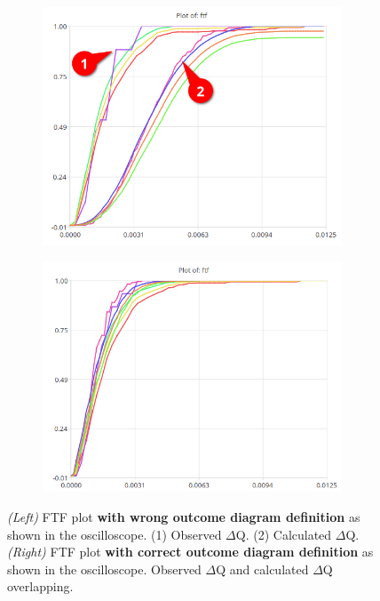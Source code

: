         \begin{figure}[H]
            \centering
            \begin{subfigure}{.5\textwidth}
                \centering
                \includegraphics[width =0.98\textwidth]{img/bad1.png}
                \label{fig:bad}
            \end{subfigure}%
            \begin{subfigure}{.5\textwidth}%
                \centering%
                \includegraphics[width =0.98\textwidth]{img/good.png}%
                \label{fig:good}%
            \end{subfigure}%
            \caption{\textit{(Left)} FTF plot \textbf{with wrong outcome diagram definition} as shown in the oscilloscope. (1) Observed $\Delta$Q. (2) Calculated $\Delta$Q. \\
            \textit{(Right)} FTF plot \textbf{with correct outcome diagram definition} as shown in the oscilloscope. Observed $\Delta$Q and calculated $\Delta$Q overlapping.}
            \label{fig:ftf_osc}%
        \end{figure}%

